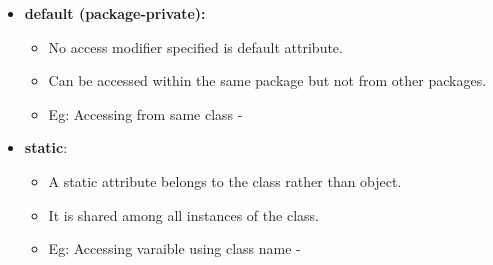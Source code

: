 \begin{flushleft}
\begin{itemize}
		\bigskip
		\item \textbf{default (package-private):} 
		\begin{itemize}
			\item No access modifier specified is default attribute. 
			\item Can be accessed within the same package but not from other packages.
			\item Eg: Accessing from same class -
			\bigskip
		\end{itemize}
	
		\item \textbf{static}:
		\begin{itemize}
			\item A static attribute belongs to the class rather than object.
			\item It is shared among all instances of the class.
			\item Eg: Accessing varaible using class name -
			\bigskip
		\end{itemize}
		\newpage
		

\end{itemize}
\end{flushleft}
